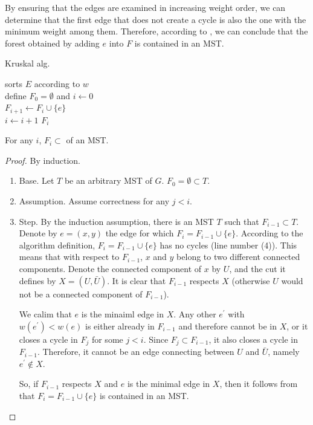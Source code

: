 By ensuring that the edges are examined in increasing weight order, we can determine that the first edge that does not create a cycle is also the one with the minimum weight among them. Therefore, according to , we can conclude that the forest obtained by adding $e$ into $F$ is contained in an MST.

\begin{algorithm} 
\SetAlgoLined
{}
\caption{ Kruskal alg.}
sorts  $E$ according to $w$ \\
define $F_{0} = \emptyset$ and $i \leftarrow 0$ \\
 {
   {
    $F_{i+1} \leftarrow F_{i} \cup \{e\}$ \\
    $i \leftarrow i + 1$
  }
}
\Return $F_{i}$
  \label{alg:krus}
\end{algorithm}

\begin{claim}
  For any $i$, $F_{i} \subset $ of an MST.
\end{claim}
\begin{proof}
  By induction. 
  \begin{enumerate}
    \item Base. Let $T$ be an arbitrary MST of $G$. $F_{0} = \emptyset \subset T $.
    \item Assumption. Assume correctness for any $j < i$. 
    \item Step. By the induction assumption, there is an MST $T$ such that $F_{i-1} \subset T$. Denote by $e=(x,y)$ the edge for which $F_{i} = F_{i-1}\cup \{e\}$. According to the algorithm definition, $F_{i} = F_{i-1} \cup \{e\}$ has no cycles (line number (4)). This means that with respect to $F_{i-1}$, $x$ and $y$ belong to two different connected components. Denote the connected component of $x$ by $U$, and the cut it defines by $X = (U, \bar{U})$. It is clear that $F_{i-1}$ respects $X$ (otherwise $U$ would not be a connected component of $F_{i-1}$).
      

      We calim that $e$ is the minaiml edge in $X$. Any other $e^{\prime}$ with $w(e^{\prime}) < w(e)$ is either already in $F_{i-1}$ and therefore cannot be in $X$, or it closes a cycle in $F_{j}$ for some $j<i$. Since $F_{j} \subset F_{i-1}$, it also closes a cycle in $F_{i-1}$. Therefore, it cannot be an edge connecting between $U$ and $\bar{U}$, namely $e^{\prime} \notin X$.


So, if $F_{i-1}$ respects $X$ and $e$ is the minimal edge in $X$, then it follows from  that $F_{i} = F_{i-1} \cup \{ e\}$ is contained in an MST.
  \end{enumerate}
\end{proof}


